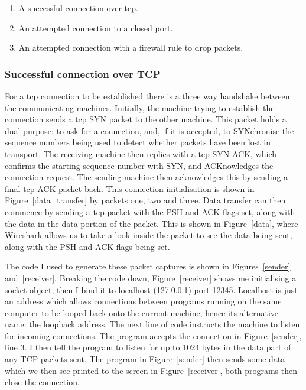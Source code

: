 \documentclass[titlepage]{article}
\let\Oldsubsubsection\subsubsection{}
\renewcommand{\subsubsection}{\FloatBarrier\Oldsubsubsection}
\begin{document}
\begin{enumerate}
  \item{A successful connection over \gls{tcp}.}
  \item{An attempted connection to a closed port.}
  \item{An attempted connection with a firewall rule to drop packets.}
\end{enumerate}

\subsubsection{Successful connection over TCP}
For a \gls{tcp} connection to be established there is a 
three way handshake between the communicating machines.
Initially, the machine trying to establish the connection sends a \gls{tcp} SYN packet to the other machine.
This packet holds a dual purpose\cite{rfc:tcp}: to ask for a connection, and, if it is accepted, to SYNchronise the 
sequence numbers being used to detect whether packets have been lost in transport.
The receiving machine then replies with a \gls{tcp} SYN ACK, which confirms the starting sequence
number with SYN, and ACKnowledges the connection request.
The sending machine then acknowledges this by sending a final \gls{tcp} ACK packet back. 
This connection initialisation is shown in Figure~\ref{data_transfer} by packets one, two and three. 
Data transfer can then commence by sending a \gls{tcp} packet with the PSH and ACK flags set, along 
with the data in the data portion of the packet. This is shown in Figure~\ref{data}, where Wireshark
allows us to take a look inside the packet to see the data being sent, along with the 
PSH and ACK flags being set. 

The code I used to generate these packet captures is shown in
Figures~\ref{sender} and~\ref{receiver}.
Breaking the code down, Figure~\ref{receiver} shows me initialising a 
socket object\cite{python:socket}, then I bind it to localhost (127.0.0.1) port 12345.
Localhost is just an address which allows connections between programs running on the
same computer to be looped back onto the current machine, hence its alternative name:
the loopback address. 
The next line of code instructs the machine to listen for incoming connections.
The program accepts the connection in Figure~\ref{sender}, line 3.
I then tell the program to listen for up to 1024 bytes in the data part of any TCP packets sent.
The program in Figure~\ref{sender} then sends some data which we then see
printed to the screen in Figure~\ref{receiver}, both programs 
then close the connection.
\end{document}
